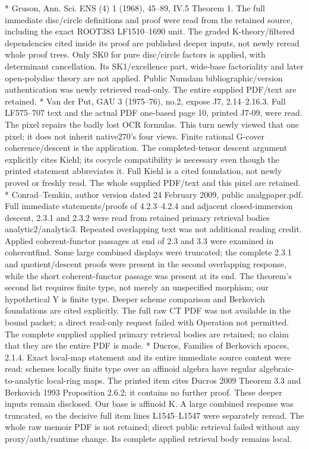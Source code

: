 \documentclass[11pt]{article}
\begin{document}
* Gruson, Ann. Sci. ENS (4) 1 (1968), 45--89, IV.5 Theorem 1. The full immediate disc/circle definitions and proof were read from the retained source, including the exact ROOT383 LF1510--1690 unit. The graded K-theory/filtered dependencies cited inside its proof are published deeper inputs, not newly reread whole proof trees. Only SK0 for pure disc/circle factors is applied, with determinant cancellation. Its SK1/excellence part, wide-base factoriality and later open-polydisc theory are not applied. Public Numdam bibliographic/version authentication was newly retrieved read-only. The entire supplied PDF/text are retained.
* Van der Put, GAU 3 (1975--76), no.2, expose J7, 2.14--2.16.3. Full LF575--707 text and the actual PDF one-based page 10, printed J7-09, were read. The pixel repairs the badly lost OCR formulas. This turn newly viewed that one pixel; it does not inherit native270's four views. Finite rational G-cover coherence/descent is the application. The completed-tensor descent argument explicitly cites Kiehl; its cocycle compatibility is necessary even though the printed statement abbreviates it. Full Kiehl is a cited foundation, not newly proved or freshly read. The whole supplied PDF/text and this pixel are retained.
* Conrad--Temkin, author version dated 24 February 2009, public analgpaper.pdf. Full immediate statements/proofs of 4.2.3--4.2.4 and adjacent closed-immersion descent, 2.3.1 and 2.3.2 were read from retained primary retrieval bodies analytic2/analytic3. Repeated overlapping text was not additional reading credit. Applied coherent-functor passages at end of 2.3 and 3.3 were examined in coherentfind. Some large combined displays were truncated; the complete 2.3.1 and quotient/descent proofs were present in the second overlapping response, while the short coherent-functor passage was present at its end. The theorem's second list requires finite type, not merely an unspecified morphism; our hypothetical Y is finite type. Deeper scheme comparison and Berkovich foundations are cited explicitly. The full raw CT PDF was not available in the bound packet; a direct read-only request failed with Operation not permitted. The complete supplied applied primary retrieval bodies are retained; no claim that they are the entire PDF is made.
* Ducros, Families of Berkovich spaces, 2.1.4. Exact local-map statement and its entire immediate source content were read: schemes locally finite type over an affinoid algebra have regular algebraic-to-analytic local-ring maps. The printed item cites Ducros 2009 Theorem 3.3 and Berkovich 1993 Proposition 2.6.2; it contains no further proof. These deeper inputs remain disclosed. Our base is affinoid K. A large combined response was truncated, so the decisive full item lines L1545--L1547 were separately reread. The whole raw memoir PDF is not retained; direct public retrieval failed without any proxy/auth/runtime change. Its complete applied retrieval body remains local.
\end{document}
